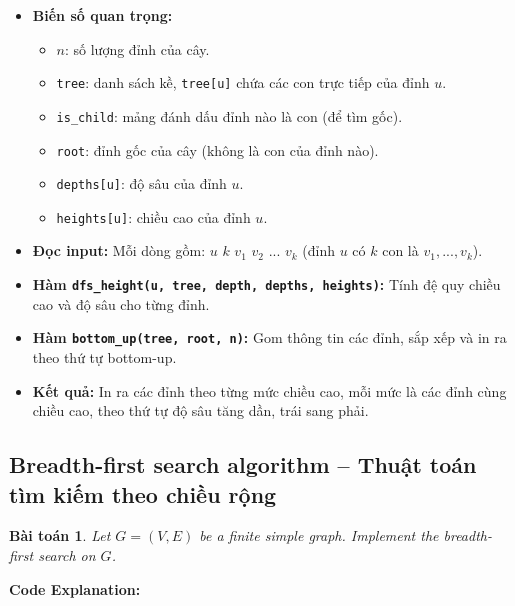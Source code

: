\documentclass{article}
\newtheorem{baitoan}{Bài toán}
\begin{document}
\begin{itemize}
    \item \textbf{Biến số quan trọng:}
    \begin{itemize}
        \item $n$: số lượng đỉnh của cây.
        \item \texttt{tree}: danh sách kề, \texttt{tree[u]} chứa các con trực tiếp của đỉnh $u$.
        \item \texttt{is\_child}: mảng đánh dấu đỉnh nào là con (để tìm gốc).
        \item \texttt{root}: đỉnh gốc của cây (không là con của đỉnh nào).
        \item \texttt{depths[u]}: độ sâu của đỉnh $u$.
        \item \texttt{heights[u]}: chiều cao của đỉnh $u$.
    \end{itemize}
    \item \textbf{Đọc input:} Mỗi dòng gồm: $u$ $k$ $v_1$ $v_2$ ... $v_k$ (đỉnh $u$ có $k$ con là $v_1, ..., v_k$).
    \item \textbf{Hàm \texttt{dfs\_height(u, tree, depth, depths, heights)}:} Tính đệ quy chiều cao và độ sâu cho từng đỉnh.
    \item \textbf{Hàm \texttt{bottom\_up(tree, root, n)}:} Gom thông tin các đỉnh, sắp xếp và in ra theo thứ tự bottom-up.
    \item \textbf{Kết quả:} In ra các đỉnh theo từng mức chiều cao, mỗi mức là các đỉnh cùng chiều cao, theo thứ tự độ sâu tăng dần, trái sang phải.
\end{itemize}



\subsection{Breadth-first search algorithm -- Thuật toán tìm kiếm theo chiều rộng}

\begin{baitoan}
    Let $G = (V,E)$ be a finite simple graph. Implement the breadth-first search on $G$.
\end{baitoan}


\textbf{Code Explanation:}
\end{document}
